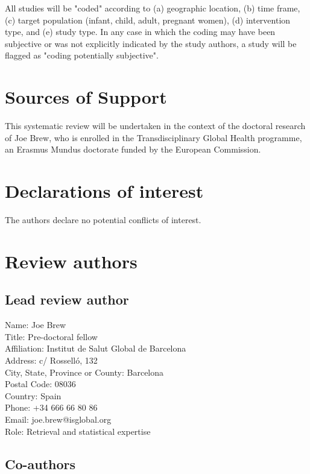 \documentclass{article}
\begin{document}
All studies will be "coded" according to (a) geographic location, (b) time frame, (c) target population (infant, child, adult, pregnant women), (d) intervention type, and (e) study type. In any case in which the coding may have been subjective or was not explicitly indicated by the study authors, a study will be flagged as "coding potentially subjective".



\section*{Sources of Support}

This systematic review will be undertaken in the context of the doctoral research of Joe Brew, who is enrolled in the Transdisciplinary Global Health programme, an Erasmus Mundus doctorate funded by the European Commission. 

\section*{Declarations of interest}

The authors declare no potential conflicts of interest.

\section*{Review authors}

\subsection*{Lead review author}

Name: Joe Brew\\
Title: Pre-doctoral fellow\\
Affiliation: Institut de Salut Global de Barcelona\\
Address: c/ Rosselló, 132\\
City, State, Province or County: Barcelona\\
Postal Code: 08036\\
Country: Spain\\
Phone: +34 666 66 80 86\\
Email: joe.brew@isglobal.org\\
Role: Retrieval and statistical expertise


\subsection*{Co-authors}
\end{document}
